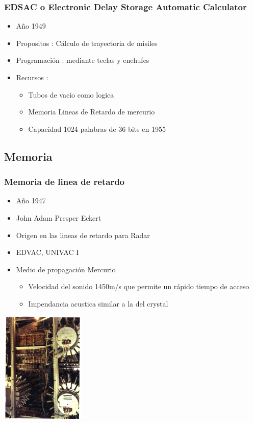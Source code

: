 \documentclass{beamer}
\begin{document}
\begin{frame}
\frametitle{EDSAC o Electronic Delay Storage Automatic Calculator}
\begin{itemize}
	\item Año 1949
	\item Propositos : Cálculo de trayectoria de misiles
	\item Programación : mediante teclas y enchufes
	\item Recursos :
		\begin{itemize}
			\item Tubos de vacio como logica
			\item Memoria Lineas de Retardo de mercurio
			\item Capacidad 1024 palabras de 36 bits en 1955
		\end{itemize}
\end{itemize}
\end{frame}

\subsection{Memoria}
\begin{frame}
\frametitle{Memoria de linea de retardo}
\begin{minipage}[c]{7.5cm}
	\begin{itemize}
		\item Año 1947
		\item John Adam Presper Eckert
		\item Origen en las lineas de retardo para Radar
		\item EDVAC, UNIVAC I
		\item Medio de propagación Mercurio
			\begin{itemize}
				\item Velocidad del sonido 1450m/s que permite un rápido tiempo de acceso
				\item Impendancia acustica similar a la del crystal 
			\end{itemize}
	\end{itemize}
\end{minipage}
\begin{minipage}[c]{4cm}
	\begin{center}
		\includegraphics[width=4cm]{delay_line.png}
	\end{center}
\end{minipage}
\end{frame}
\end{document}
